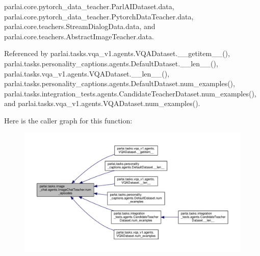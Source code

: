 parlai.\+core.\+pytorch\+\_\+data\+\_\+teacher.\+Parl\+A\+I\+Dataset.\+data, parlai.\+core.\+pytorch\+\_\+data\+\_\+teacher.\+Pytorch\+Data\+Teacher.\+data, parlai.\+core.\+teachers.\+Stream\+Dialog\+Data.\+data, and parlai.\+core.\+teachers.\+Abstract\+Image\+Teacher.\+data.



Referenced by parlai.\+tasks.\+vqa\+\_\+v1.\+agents.\+V\+Q\+A\+Dataset.\+\_\+\+\_\+getitem\+\_\+\+\_\+(), parlai.\+tasks.\+personality\+\_\+captions.\+agents.\+Default\+Dataset.\+\_\+\+\_\+len\+\_\+\+\_\+(), parlai.\+tasks.\+vqa\+\_\+v1.\+agents.\+V\+Q\+A\+Dataset.\+\_\+\+\_\+len\+\_\+\+\_\+(), parlai.\+tasks.\+personality\+\_\+captions.\+agents.\+Default\+Dataset.\+num\+\_\+examples(), parlai.\+tasks.\+integration\+\_\+tests.\+agents.\+Candidate\+Teacher\+Dataset.\+num\+\_\+examples(), and parlai.\+tasks.\+vqa\+\_\+v1.\+agents.\+V\+Q\+A\+Dataset.\+num\+\_\+examples().

Here is the caller graph for this function\+:
\nopagebreak
\begin{figure}[H]
\begin{center}
\leavevmode
\includegraphics[width=350pt]{classparlai_1_1tasks_1_1image__chat_1_1agents_1_1ImageChatTeacher_ae37398f75ec883f5bbf276bf7b2cf715_icgraph}
\end{center}
\end{figure}
\mbox{\label{classparlai_1_1tasks_1_1image__chat_1_1agents_1_1ImageChatTeacher_a79f6d03e7d21be3a61bad00252f8ea66}} 
